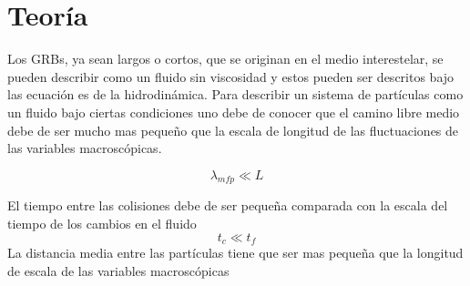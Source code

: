 \documentclass[12pt,a4paper]{book}
\begin{document}


\chapter{Teoría}

Los GRBs, ya sean largos o cortos, que se originan en el medio interestelar, se pueden describir como un fluido sin viscosidad y estos pueden ser descritos bajo
las ecuación  es de la hidrodinámica.
Para describir un sistema de partículas como un fluido bajo ciertas condiciones uno debe de conocer que el camino libre medio debe de ser mucho mas pequeño que la escala de longitud de las fluctuaciones de las variables macroscópicas.

\begin{equation}
\lambda_{mfp} \ll L
\end{equation}

El tiempo entre las colisiones debe de ser pequeña comparada con la escala del tiempo de los cambios en el fluido
\begin{equation}
t_{c} \ll t_f
\end{equation}
La distancia media entre las partículas tiene que ser mas pequeña que la longitud de escala de las variables macroscópicas
\end{document}
